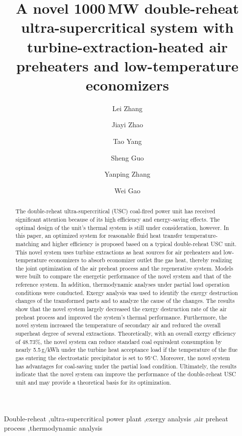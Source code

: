 \documentclass[preprint,12pt]{elsarticle}
\begin{document}
\begin{frontmatter}



\title{A novel 1000\,MW double-reheat ultra-supercritical system with turbine-extraction-heated air preheaters and low-temperature economizers}


\author[hust,ncst]{Lei Zhang}
\author[hust]{Jiayi Zhao}
\author[hust]{Tao Yang}
\author[hust]{Sheng Guo}
\author[hust]{Yanping Zhang}
\author[hust]{Wei Gao}


\address[hust]{School of Energy and Power Engineering, Huazhong University of Science and Technology, Wuhan 430074, China}
\address[ncst]{College of Metallurgy and Energy, North China University of Science and Technology, Tangshan 063009, China}

\begin{abstract}
The double-reheat ultra-supercritical (USC) coal-fired power unit has received significant attention because of its high efficiency and energy-saving effects.
The optimal design of the unit's thermal system is still under consideration, however.
In this paper, an optimized system for reasonable fluid heat transfer temperature-matching and higher efficiency is proposed based on a typical double-reheat USC unit.
This novel system uses turbine extractions as heat sources for air preheaters and low-temperature economizers to absorb economizer outlet flue gas heat, thereby realizing the joint optimization of the air preheat process and the regenerative system.
Models were built to compare the energetic performance of the novel system and that of the reference system.
In addition, thermodynamic analyses under partial load operation conditions were conducted. 
Exergy analysis was used to identify the exergy destruction changes of the transformed parts and to analyze the cause of the changes.
The results show that the novel system largely decreased the exergy destruction rate of the air preheat process and improved the system's thermal performance.
Furthermore, the novel system increased the temperature of secondary air and reduced the overall superheat degree of several extractions.
Theoretically, with an overall exergy efficiency of 48.73\%, the novel system can reduce standard coal equivalent consumption by nearly 5.5\,g/kWh under the turbine heat acceptance load if the temperature of the flue gas entering the electrostatic precipitator is set to 95$^\circ$C.
Moreover, the novel system has advantages for coal-saving under the partial load condition.
Ultimately, the results indicate that the novel system can improve the performance of the double-reheat USC unit and may provide a theoretical basis for its optimization.

\end{abstract}

\begin{keyword}
Double-reheat \sep ultra-supercritical power plant \sep exergy analysis \sep air preheat process \sep thermodynamic analysis
\end{keyword}

\end{frontmatter}
\end{document}
